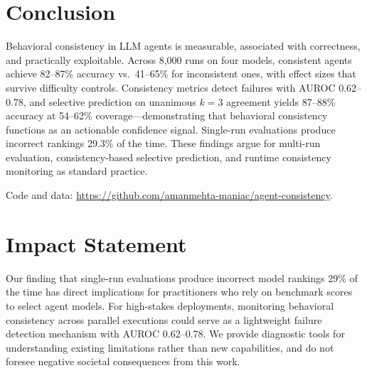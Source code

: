 \documentclass{article}
\begin{document}
\section{Conclusion}

Behavioral consistency in LLM agents is measurable, associated with correctness, and practically exploitable. Across 8,000 runs on four models, consistent agents achieve 82--87\% accuracy vs.\ 41--65\% for inconsistent ones, with effect sizes that survive difficulty controls. Consistency metrics detect failures with AUROC 0.62--0.78, and selective prediction on unanimous $k\!=\!3$ agreement yields 87--88\% accuracy at 54--62\% coverage---demonstrating that behavioral consistency functions as an actionable confidence signal. Single-run evaluations produce incorrect rankings 29.3\% of the time. These findings argue for multi-run evaluation, consistency-based selective prediction, and runtime consistency monitoring as standard practice.

Code and data: \url{https://github.com/amanmehta-maniac/agent-consistency}.

\section*{Impact Statement}

Our finding that single-run evaluations produce incorrect model rankings 29\% of the time has direct implications for practitioners who rely on benchmark scores to select agent models. For high-stakes deployments, monitoring behavioral consistency across parallel executions could serve as a lightweight failure detection mechanism with AUROC 0.62--0.78. We provide diagnostic tools for understanding existing limitations rather than new capabilities, and do not foresee negative societal consequences from this work.




\appendix
\end{document}
